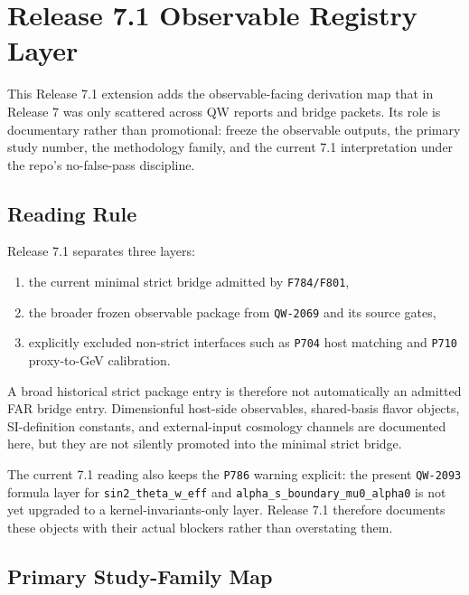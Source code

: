 \chapter{Release 7.1 Observable Registry Layer}

\makeatletter
\renewcommand{\theHsubsection}{r71obs.\thesection.\arabic{subsection}}
\makeatother

This Release 7.1 extension adds the observable-facing derivation map that in
Release 7 was only scattered across QW reports and bridge packets. Its role is
documentary rather than promotional: freeze the observable outputs, the primary
study number, the methodology family, and the current 7.1 interpretation under
the repo's no-false-pass discipline.

\section{Reading Rule}

Release 7.1 separates three layers:
\begin{enumerate}[label=\arabic*.]
  \item the current minimal strict bridge admitted by \texttt{F784/F801},
  \item the broader frozen observable package from \texttt{QW-2069} and its source gates,
  \item explicitly excluded non-strict interfaces such as \texttt{P704} host matching and \texttt{P710} proxy-to-GeV calibration.
\end{enumerate}

A broad historical strict package entry is therefore not automatically an
admitted FAR bridge entry. Dimensionful host-side observables, shared-basis
flavor objects, SI-definition constants, and external-input cosmology channels
are documented here, but they are not silently promoted into the minimal strict
bridge.

The current 7.1 reading also keeps the \texttt{P786} warning explicit: the
present \texttt{QW-2093} formula layer for \texttt{sin2\_theta\_w\_eff} and
\texttt{alpha\_s\_boundary\_mu0\_alpha0} is not yet upgraded to a
kernel-invariants-only layer. Release 7.1 therefore documents these objects
with their actual blockers rather than overstating them.

\section{Primary Study-Family Map}

